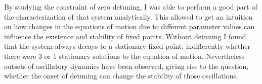 By studying the constraint of zero detuning, I was able to perform a good part of the characterization of that system analytically. This allowed to get an intuition on how changes in the equations of motion due to different parameter values can influence the existence and stability of fixed points. Without detuning I found that the system always decays to a stationary fixed point, indifferently whether there were 3 or 1 stationary solutions to the equation of motion. Nevertheless outsets of oscillatory dynamics have been observed, giving rise to the question, whether the onset of detuning can change the stability of those oscillations. 
